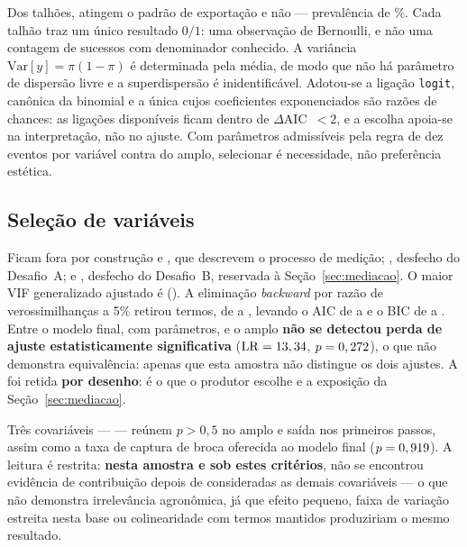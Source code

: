 Dos \baseN{} talhões, \cExporta{} atingem o padrão de exportação e \cNaoExporta{} não ---
prevalência de \cPrevalencia\%. Cada talhão traz um único resultado $0/1$: uma observação
de Bernoulli, e não uma contagem de sucessos com denominador conhecido. A variância
$\mathrm{Var}[y] = \pi(1-\pi)$ é determinada pela média, de modo que não há parâmetro de
dispersão livre e a superdispersão é inidentificável. Adotou-se a ligação \texttt{logit},
canônica da binomial e a única cujos coeficientes exponenciados são razões de chances: as
\cLigacoesEquiv{} ligações disponíveis ficam dentro de $\Delta$AIC~$< 2$, e a escolha
apoia-se na interpretação, não no ajuste. Com \cEPV{} parâmetros admissíveis pela regra
de dez eventos por variável \cite{peduzzi1996} contra \cNparFull{} do amplo, selecionar
é necessidade, não preferência estética.

\subsection{Seleção de variáveis}

Ficam fora por construção  e , que descrevem o
processo de medição; , desfecho do Desafio~A; e
, desfecho do Desafio~B, reservada à Seção~\ref{sec:mediacao}.
O maior VIF generalizado ajustado é \cVIFmax{} (\cVIFmaxTermo). A eliminação
\textit{backward} por razão de verossimilhanças a 5\% retirou \cRetirados{} termos, de
\cPrimeiroRetirado{} a \cUltimoRetirado{}, levando o AIC de \cAICfull{} a \cAIC{} e o BIC
de \cBICfull{} a \cBIC{}. Entre o modelo final, com \cNpar{} parâmetros, e o amplo
\textbf{não se detectou perda de ajuste estatisticamente significativa}
($\mathrm{LR} = 13,34$, $p = 0,272$), o que não demonstra equivalência:
apenas que esta amostra não distingue os dois ajustes. A  foi retida
\textbf{por desenho}: é o que o produtor escolhe e a exposição da
Seção~\ref{sec:mediacao}.

Três covariáveis --- \cIrrelevantes{} --- reúnem $p > 0{,}5$ no amplo e saída nos
primeiros passos, assim como a taxa de captura de broca oferecida ao modelo final
($p = 0,919$). A leitura é restrita: \textbf{nesta amostra e sob estes critérios}, não
se encontrou evidência de contribuição depois de consideradas as demais covariáveis ---
o que não demonstra irrelevância agronômica, já que efeito pequeno, faixa de variação
estreita nesta base ou colinearidade com termos mantidos produziriam o mesmo resultado.


